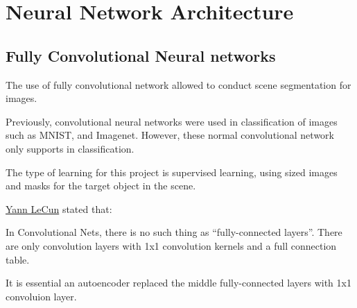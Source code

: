 \documentclass[paper=a4, fontsize=11pt]{scrartcl} %
\numberwithin{equation}{section} %
\numberwithin{figure}{section} %
\numberwithin{table}{section} %
\begin{document}
 
\section{Neural Network Architecture}

\subsection{Fully Convolutional Neural networks}\label{rubric10}

The use of fully convolutional network allowed to conduct scene segmentation for images.

Previously, convolutional neural networks were used in classification of images such as MNIST, and Imagenet. However, these normal convolutional network only supports in classification.

The type of learning for this project is supervised learning, using sized images and masks for the target object in the scene.

\href{https://www.facebook.com/yann.lecun/posts/10152820758292143}{Yann LeCun} stated that:

\begin{displayquote}
	In Convolutional Nets, there is no such thing as “fully-connected layers”. There are only convolution layers with 1x1 convolution kernels and a full connection table.
\end{displayquote}

It is essential an autoencoder replaced the middle fully-connected layers with 1x1 convoluion layer.
\end{document}
